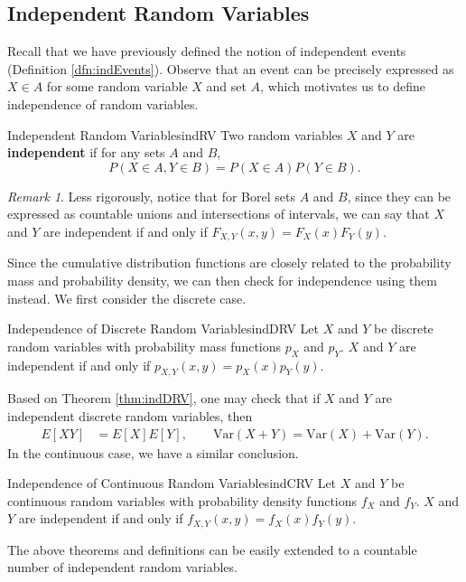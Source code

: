 \documentclass[math]{amznotes}
\theoremstyle{remark}
\newtheorem*{remark}{Remark}
\begin{document}
\subsection{Independent Random Variables}
Recall that we have previously defined the notion of independent events (Definition \ref{dfn:indEvents}). Observe that an event can be precisely expressed as $X \in A$ for some random variable $X$ and set $A$, which motivates us to define independence of random variables.
\begin{dfnbox}{Independent Random Variables}{indRV}
    Two random variables $X$ and $Y$ are {\color{red} \textbf{independent}} if for any sets $A$ and $B$,
    \begin{equation*}
        P(X \in A, Y \in B) = P(X \in A)P(Y \in B).
    \end{equation*}
\end{dfnbox}
\begin{notebox}
    \begin{remark}
        Less rigorously, notice that for Borel sets $A$ and $B$, since they can be expressed as countable unions and intersections of intervals, we can say that $X$ and $Y$ are independent if and only if $F_{X, Y}(x, y) = F_X(x)F_Y(y)$.
    \end{remark}
\end{notebox}
Since the cumulative distribution functions are closely related to the probability mass and probability density, we can then check for independence using them instead. We first consider the discrete case.
\begin{thmbox}{Independence of Discrete Random Variables}{indDRV}
    Let $X$ and $Y$ be discrete random variables with probability mass functions $p_X$ and $p_Y$. $X$ and $Y$ are independent if and only if $p_{X, Y}(x, y) = p_X(x)p_Y(y)$.
\end{thmbox}
Based on Theorem \ref{thm:indDRV}, one may check that if $X$ and $Y$ are independent discrete random variables, then 
\begin{align*}
    E[XY] & = E[X]E[Y], \qquad \mathrm{Var}(X + Y) = \mathrm{Var}(X) + \mathrm{Var}(Y).
\end{align*}
In the continuous case, we have a similar conclusion.
\begin{thmbox}{Independence of Continuous Random Variables}{indCRV}
    Let $X$ and $Y$ be continuous random variables with probability density functions $f_X$ and $f_Y$. $X$ and $Y$ are independent if and only if $f_{X, Y}(x, y) = f_X(x)f_Y(y)$.
\end{thmbox}
The above theorems and definitions can be easily extended to a countable number of independent random variables.
\end{document}
